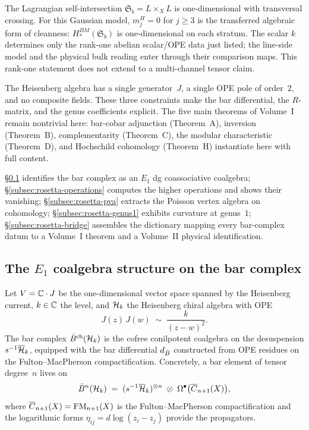 The Lagrangian self-intersection $\mathfrak{S}_b = L \times_X L$ is
one-dimensional with transversal crossing. For this Gaussian model,
$m^H_j=0$ for $j\geq3$ is the transferred algebraic form of cleanness:
$H_*^{BM}(\mathfrak{S}_b)$ is one-dimensional on each stratum. The scalar
$k$ determines only the rank-one abelian scalar/OPE data just listed; the
line-side model and the physical bulk reading enter through their comparison
maps. This rank-one statement does not extend to a multi-channel tensor
claim.

The Heisenberg algebra has a single generator~$J$, a single OPE pole of order~$2$, and no composite fields. These three constraints make the bar differential, the $R$-matrix, and the genus coefficients explicit. The five main theorems of Volume~I remain nontrivial here: bar-cobar adjunction (Theorem~A), inversion (Theorem~B), complementarity (Theorem~C), the modular characteristic (Theorem~D), and Hochschild cohomology (Theorem~H) instantiate here with full content.

\S\ref{subsec:rosetta-e1-coalgebra} identifies the bar complex as an $E_1$ dg coassociative coalgebra; \S\ref{subsec:rosetta-operations} computes the higher operations and shows their vanishing; \S\ref{subsec:rosetta-pva} extracts the Poisson vertex algebra on cohomology; \S\ref{subsec:rosetta-genus1} exhibits curvature at genus~$1$; \S\ref{subsec:rosetta-bridge} assembles the dictionary mapping every bar-complex datum to a Volume~I theorem and a Volume~II physical identification.


\subsection{The $E_1$ coalgebra structure on the bar complex}
\label{subsec:rosetta-e1-coalgebra}

Let $V = \mathbb{C} \cdot J$ be the one-dimensional vector space spanned by the Heisenberg current, $k \in \mathbb{C}$ the level, and $\mathcal{H}_k$ the Heisenberg chiral algebra with OPE
\begin{equation}\label{eq:rosetta-heisenberg-ope}
J(z)\, J(w) \;\sim\; \frac{k}{(z - w)^2}.
\end{equation}
The bar complex $\bar{B}^{\mathrm{ch}}(\mathcal{H}_k)$ is the cofree
conilpotent coalgebra on the desuspension $s^{-1}\overline{\mathcal{H}}_k$,
equipped with the bar differential $d_{\bar{B}}$ constructed from
OPE residues on the Fulton--MacPherson compactification.
Concretely, a bar element of tensor degree~$n$ lives on
\begin{equation}\label{eq:rosetta-bar-element-space}
\bar{B}^n(\mathcal{H}_k) \;=\;
(s^{-1}\overline{\mathcal{H}}_k)^{\otimes n}
\;\otimes\;
\Omega^{\bullet}\bigl(\overline{C}_{n+1}(X)\bigr),
\end{equation}
where $\overline{C}_{n+1}(X) = \mathrm{FM}_{n+1}(X)$ is the
Fulton--MacPherson compactification and the logarithmic forms
$\eta_{ij} = d\log(z_i - z_j)$ provide the propagators.

